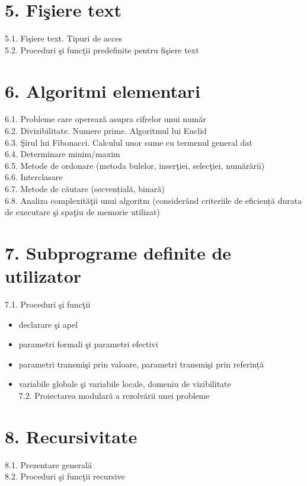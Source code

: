 \documentclass[10pt]{article}
\begin{document}
\section*{5. Fişiere text}
5.1. Fişiere text. Tipuri de acces\\
5.2. Proceduri şi funcţii predefinite pentru fişiere text

\section*{6. Algoritmi elementari}
6.1. Probleme care operează asupra cifrelor unui număr\\
6.2. Divizibilitate. Numere prime. Algoritmul lui Euclid\\
6.3. Şirul lui Fibonacci. Calculul unor sume cu termenul general dat\\
6.4. Determinare minim/maxim\\
6.5. Metode de ordonare (metoda bulelor, inserţiei, selecţiei, numărării)\\
6.6. Interclasare\\
6.7. Metode de căutare (secvențială, binară)\\
6.8. Analiza complexităţii unui algoritm (considerând criteriile de eficiență durata de executare şi spaţiu de memorie utilizat)

\section*{7. Subprograme definite de utilizator}
7.1. Proceduri şi funcţii

\begin{itemize}
  \item declarare şi apel
  \item parametri formali şi parametri efectivi
  \item parametri transmişi prin valoare, parametri transmişi prin referință
  \item variabile globale şi variabile locale, domeniu de vizibilitate\\
7.2. Proiectarea modulară a rezolvării unei probleme
\end{itemize}

\section*{8. Recursivitate}
8.1. Prezentare generală\\
8.2. Proceduri şi funcţii recursive
\end{document}
